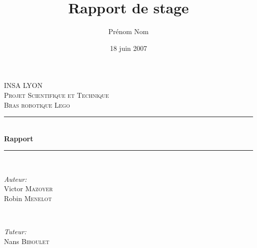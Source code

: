 \documentclass[a4paper, titlepage, twocolumn]{report}
\title{Rapport de stage}      %
\author{Prénom Nom}           %
\date{18 juin 2007}           %
\begin{document}
\begin{titlepage}

\newcommand{\HRule}{\rule{\linewidth}{0.5mm}} %

\center %
 

\textsc{\LARGE INSA LYON}\\[1.5cm] %
\textsc{\Large Projet Scientifique et Technique}\\[0.5cm] %
\textsc{\large Bras robotique Lego}\\[0.5cm] %


\HRule \\[0.4cm]
{ \huge \bfseries Rapport}\\[0.4cm] %
\HRule \\[1.5cm]
 

\begin{minipage}{0.4\textwidth}
\begin{flushleft} \large
\emph{Auteur:}\\ 
Victor \textsc{Mazoyer}\\ 
Robin \textsc{Menelot}
\end{flushleft}
\end{minipage}
~
\begin{minipage}{0.4\textwidth}
\begin{flushright} \large
\emph{Tuteur:} \\
Nans \textsc{Biboulet} 
\end{flushright}
\end{minipage}\\[4cm]



\end{titlepage}
\end{document}
